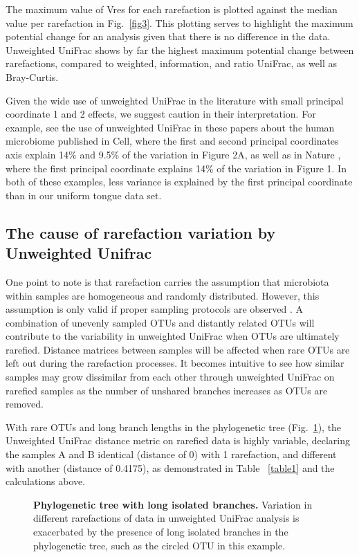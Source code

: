 \documentclass[10pt,letterpaper]{article}
\begin{document}
The maximum value of Vres for each rarefaction is plotted against the median value per rarefaction in Fig.~\ref{fig3}. This plotting serves to highlight the maximum potential change for an analysis given that there is no difference in the data. Unweighted UniFrac shows by far the highest maximum potential change between rarefactions, compared to weighted, information, and ratio UniFrac, as well as Bray-Curtis.

Given the wide use of unweighted UniFrac in the literature with small principal coordinate 1 and 2 effects, we suggest caution in their interpretation. For example, see the use of unweighted UniFrac in these papers about the human microbiome published in Cell\cite{hsiao2013microbiota}, where the first and second principal coordinates axis explain 14\% and 9.5\% of the variation in Figure 2A, as well as in Nature \cite{sonnenburg2016diet}, where the first principal coordinate explains 14\% of the variation in Figure 1. In both of these examples, less variance is explained by the first principal coordinate than in our uniform tongue data set.

\FloatBarrier

\subsection{The cause of rarefaction variation by Unweighted Unifrac}
One point to note is that rarefaction carries the assumption that microbiota within samples are homogeneous and randomly distributed. However, this assumption is only valid if proper sampling protocols are observed \cite{gorzelak2015methods}. A combination of unevenly sampled OTUs and distantly related OTUs will contribute to the variability in unweighted UniFrac when OTUs are ultimately rarefied. Distance matrices between samples will be affected when rare OTUs are left out during the rarefaction processes. It becomes intuitive to see how similar samples may grow dissimilar from each other through unweighted UniFrac on rarefied samples as the number of unshared branches increases as OTUs are removed.

With rare OTUs and long branch lengths in the phylogenetic tree (Fig.~\ref{fig4}), the Unweighted UniFrac distance metric on rarefied data is highly variable, declaring the samples A and B identical (distance of 0) with 1 rarefaction, and different with another (distance of 0.4175), as demonstrated in Table ~\ref{table1} and the calculations above.

\begin{figure}[h]
\caption[Phylogenetic tree with long isolated branches.]{{\bf Phylogenetic tree with long isolated branches.}
Variation in different rarefactions of data in unweighted UniFrac analysis is exacerbated by the presence of long isolated branches in the phylogenetic tree, such as the circled OTU in this example.}
\label{fig4}
\end{figure}
\end{document}
